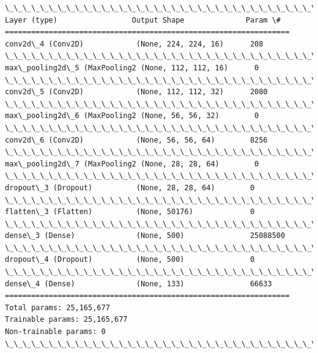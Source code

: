 \documentclass[11pt]{article}
\begin{document}
    \begin{Verbatim}[commandchars=\\\{\}]
\_\_\_\_\_\_\_\_\_\_\_\_\_\_\_\_\_\_\_\_\_\_\_\_\_\_\_\_\_\_\_\_\_\_\_\_\_\_\_\_\_\_\_\_\_\_\_\_\_\_\_\_\_\_\_\_\_\_\_\_\_\_\_\_\_
Layer (type)                 Output Shape              Param \#   
=================================================================
conv2d\_4 (Conv2D)            (None, 224, 224, 16)      208       
\_\_\_\_\_\_\_\_\_\_\_\_\_\_\_\_\_\_\_\_\_\_\_\_\_\_\_\_\_\_\_\_\_\_\_\_\_\_\_\_\_\_\_\_\_\_\_\_\_\_\_\_\_\_\_\_\_\_\_\_\_\_\_\_\_
max\_pooling2d\_5 (MaxPooling2 (None, 112, 112, 16)      0         
\_\_\_\_\_\_\_\_\_\_\_\_\_\_\_\_\_\_\_\_\_\_\_\_\_\_\_\_\_\_\_\_\_\_\_\_\_\_\_\_\_\_\_\_\_\_\_\_\_\_\_\_\_\_\_\_\_\_\_\_\_\_\_\_\_
conv2d\_5 (Conv2D)            (None, 112, 112, 32)      2080      
\_\_\_\_\_\_\_\_\_\_\_\_\_\_\_\_\_\_\_\_\_\_\_\_\_\_\_\_\_\_\_\_\_\_\_\_\_\_\_\_\_\_\_\_\_\_\_\_\_\_\_\_\_\_\_\_\_\_\_\_\_\_\_\_\_
max\_pooling2d\_6 (MaxPooling2 (None, 56, 56, 32)        0         
\_\_\_\_\_\_\_\_\_\_\_\_\_\_\_\_\_\_\_\_\_\_\_\_\_\_\_\_\_\_\_\_\_\_\_\_\_\_\_\_\_\_\_\_\_\_\_\_\_\_\_\_\_\_\_\_\_\_\_\_\_\_\_\_\_
conv2d\_6 (Conv2D)            (None, 56, 56, 64)        8256      
\_\_\_\_\_\_\_\_\_\_\_\_\_\_\_\_\_\_\_\_\_\_\_\_\_\_\_\_\_\_\_\_\_\_\_\_\_\_\_\_\_\_\_\_\_\_\_\_\_\_\_\_\_\_\_\_\_\_\_\_\_\_\_\_\_
max\_pooling2d\_7 (MaxPooling2 (None, 28, 28, 64)        0         
\_\_\_\_\_\_\_\_\_\_\_\_\_\_\_\_\_\_\_\_\_\_\_\_\_\_\_\_\_\_\_\_\_\_\_\_\_\_\_\_\_\_\_\_\_\_\_\_\_\_\_\_\_\_\_\_\_\_\_\_\_\_\_\_\_
dropout\_3 (Dropout)          (None, 28, 28, 64)        0         
\_\_\_\_\_\_\_\_\_\_\_\_\_\_\_\_\_\_\_\_\_\_\_\_\_\_\_\_\_\_\_\_\_\_\_\_\_\_\_\_\_\_\_\_\_\_\_\_\_\_\_\_\_\_\_\_\_\_\_\_\_\_\_\_\_
flatten\_3 (Flatten)          (None, 50176)             0         
\_\_\_\_\_\_\_\_\_\_\_\_\_\_\_\_\_\_\_\_\_\_\_\_\_\_\_\_\_\_\_\_\_\_\_\_\_\_\_\_\_\_\_\_\_\_\_\_\_\_\_\_\_\_\_\_\_\_\_\_\_\_\_\_\_
dense\_3 (Dense)              (None, 500)               25088500  
\_\_\_\_\_\_\_\_\_\_\_\_\_\_\_\_\_\_\_\_\_\_\_\_\_\_\_\_\_\_\_\_\_\_\_\_\_\_\_\_\_\_\_\_\_\_\_\_\_\_\_\_\_\_\_\_\_\_\_\_\_\_\_\_\_
dropout\_4 (Dropout)          (None, 500)               0         
\_\_\_\_\_\_\_\_\_\_\_\_\_\_\_\_\_\_\_\_\_\_\_\_\_\_\_\_\_\_\_\_\_\_\_\_\_\_\_\_\_\_\_\_\_\_\_\_\_\_\_\_\_\_\_\_\_\_\_\_\_\_\_\_\_
dense\_4 (Dense)              (None, 133)               66633     
=================================================================
Total params: 25,165,677
Trainable params: 25,165,677
Non-trainable params: 0
\_\_\_\_\_\_\_\_\_\_\_\_\_\_\_\_\_\_\_\_\_\_\_\_\_\_\_\_\_\_\_\_\_\_\_\_\_\_\_\_\_\_\_\_\_\_\_\_\_\_\_\_\_\_\_\_\_\_\_\_\_\_\_\_\_

    \end{Verbatim}
\end{document}
